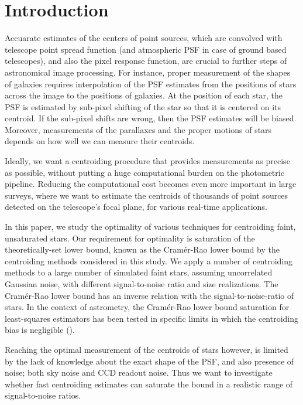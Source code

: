 \documentclass[12pt, preprint]{aastex}
\begin{document}

\section{Introduction}

Accuarate estimates of the centers of point sources, which are convolved with telescope point spread function (and atmospheric PSF in case of ground based telescopes), and also the pixel response function, are crucial to further steps of
astronomical image processing. For instance, proper measurement of the shapes of galaxies
requires interpolation of the PSF estimates from the positions of stars across the
image to the positions of galaxies. At the position of each star, the PSF is estimated by sub-pixel 
shifting of the star so that it is centered on its centroid. If the sub-pixel shifts are wrong, then 
the PSF estimates will be biased. Moreover, measurements of the parallaxes and the proper motions of stars
depends on how well we can measure their centroids. 

Ideally, we want a centroiding procedure that provides measurements as precise 
as possible, without putting a huge computational burden on the photometric pipeline.
Reducing the computational cost becomes even more important in large surveys,
where we want to estimate the centroids of thousands of point sources detected
on the telescope's focal plane, for various real-time applications.

In this paper, we study the optimality of various techniques for centroiding 
faint, unsaturated stars. Our requirement for optimality is saturation of the 
theoretically-set lower bound, known as the Cram\'{e}r-Rao lower bound by the 
centroiding methods considered in this study. We apply a number of 
centroiding methods to a large number of simulated faint stars, assuming uncorrelated 
Gaussian noise, with different signal-to-noise ratio and size realizations. 
The Cram\'{e}r-Rao lower bound has an inverse relation with the signal-to-noise-ratio 
of stars. In the context of astrometry, the Cram\'{e}r-Rao lower bound saturation for least-squares 
estimators has been tested in specific limits in which the centroiding bias is 
negligible (\citealt{lobos}). 

Reaching the optimal measurement of the centroids of stars however, is limited
by the lack of knowledge about the exact shape of the PSF, and also presence of noise;
both sky noise and CCD readout noise. Thus we want to investigate whether fast centroiding 
estimates can saturate the bound in a realistic range of signal-to-noise ratios.
\end{document}
